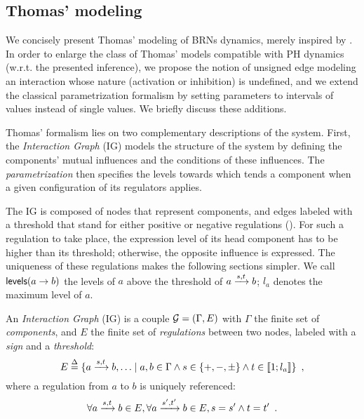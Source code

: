 \subsection{Thomas' modeling}

We concisely present Thomas' modeling of BRNs dynamics, merely inspired by
\cite{Richard06,BernotSemBRN}.
In order to enlarge the class of Thomas' models compatible with PH dynamics (w.r.t. the presented
inference),
we propose the notion of unsigned edge modeling an interaction whose nature (activation or inhibition) is undefined,
and we extend the classical parametrization formalism by setting parameters to intervals of values instead of single values.
We briefly discuss these additions.

Thomas' formalism lies on two complementary descriptions of the system. First, the
\emph{Interaction Graph} (IG) models the structure of the system by defining the components'
mutual influences and the conditions of these influences.
The \emph{parametrization} then specifies the levels towards which tends a component when a given
configuration of its regulators applies.

The IG is composed of nodes that represent components, and edges labeled with a threshold that stand
for either positive or negative regulations ().
For such a regulation to take place, the expression level of its head component has to be higher than its threshold; otherwise, the opposite influence is expressed.
The uniqueness of these regulations makes the following sections simpler.
We call $\mathsf{levels}(a\rightarrow b)$ the levels of $a$ above the threshold of $a \xrightarrow{s, t} b$;
$l_a$ denotes the maximum level of $a$.

\begin{definition}
\label{def:ig}
An \emph{Interaction Graph} (IG) is a couple $\mathcal{G} = (\Gamma, E)$ with $\Gamma$ the finite set of \emph{components},
and $E$ the finite set of \emph{regulations} between two nodes, labeled with a \emph{sign} and a \emph{threshold}:
$$E \stackrel{\Delta}= \{ a \xrightarrow{s, t} b, \ldots \mid a, b \in \Gamma \wedge s \in \{ +, -, \pm \} \wedge t \in \llbracket 1 ; l_a \rrbracket\} \enspace,$$
where a regulation from $a$ to $b$ is uniquely referenced:
$$\forall a \xrightarrow{s, t} b \in E, \forall a \xrightarrow{s', t'} b \in E, s = s' \wedge t = t' \enspace.$$
\end{definition}

